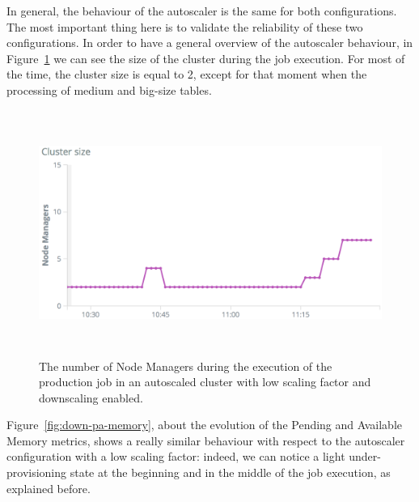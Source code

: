 \documentclass[12pt,twoside,cucitura]{toptesi}
\begin{document}
In general, the behaviour of the autoscaler is the same for both configurations. The most important thing here is to validate the reliability of these two configurations. In order to have a general overview of the autoscaler behaviour, in Figure~\ref{fig:down-size} we can see the size of the cluster during the job execution. For most of the time, the cluster size is equal to 2, except for that moment when the processing of medium and big-size tables.  

\begin{figure}
\centering
\includegraphics[height=80mm]{down-size}
\caption{The number of Node Managers during the execution of the production job in an autoscaled cluster with low scaling factor and downscaling enabled.}\label{fig:down-size}
\end{figure}

Figure~\ref{fig:down-pa-memory}, about the evolution of the Pending and Available Memory metrics, shows a really similar behaviour with respect to the autoscaler configuration with a low scaling factor: indeed, we can notice a light under-provisioning state at the beginning and in the middle of the job execution, as explained before.
\end{document}
